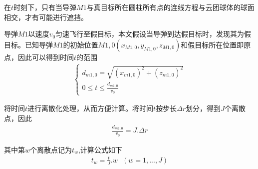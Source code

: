 \documentclass[../main.tex]{subfiles}
\begin{document}
\par 在$t$时刻下，只有当导弹$M1$与真目标所在圆柱所有点的连线方程与云团球体的球面相交，才有可能进行遮挡。
\par 导弹$M1$以速度$v_0$匀速飞行至假目标，本文假设当导弹到达假目标时，发现其为假目标。已知导弹$M1$的初始位置\( M{1,0}(x_{M{1,0}}, y_{M{1,0}}, z_{M{1,0}}) \)和假目标所在位置即原点，因此可以得到时间$t$的范围
\begin{align}\label{1.190}
\begin{cases}
d_{m1,0} = \sqrt{(x_{m1,0})^2 + (z_{m1,0})^2} \\
0 \leq t \leq \frac{d_{m1,0}}{v_0}
\end{cases}
\end{align}
\par 将时间$t$进行离散化处理，从而方便计算。将时间$t$按步长$\varDelta r$划分，得到$J$个离散点，因此
\begin{align}\label{1.191}
	\frac{d_{m1,0}}{v_0}=J.\varDelta r
\end{align}

\par 其中第$w$个离散点记为$t_w$,计算公式如下
\begin{align}\label{1.52}
	t_w=\frac{t}{J}.w\,\,\,\,\left( w=1,...,J\right) 
\end{align}
\end{document}
